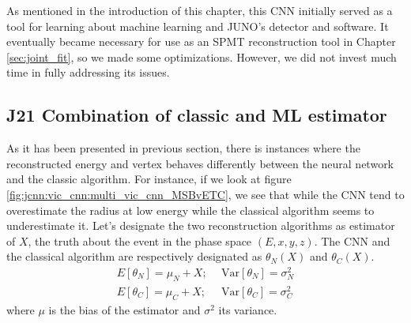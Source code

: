 \documentclass[../main.tex]{subfiles}
\begin{document}
As mentioned in the introduction of this chapter, this CNN initially served as a tool for learning about machine learning and JUNO's detector and software. It eventually became necessary for use as an SPMT reconstruction tool in Chapter \ref{sec:joint_fit}, so we made some optimizations. However, we did not invest much time in fully addressing its issues.

\subsection{J21 Combination of classic and ML estimator}
\label{sec:jcnn:combination}


As it has been presented in previous section, there is instances where the reconstructed energy and vertex behaves differently between the neural network and  the classic algorithm. For instance, if we look at figure \ref{fig:jcnn:vic_cnn:multi_vic_cnn_MSBvETC}, we see that while the CNN tend to overestimate the radius at low energy while the classical algorithm seems to underestimate it. Let's designate the two reconstruction algorithms as estimator of $X$, the truth about the event in the phase space $(E, x, y, z)$. The CNN and the classical algorithm are respectively designated as $\theta_{N}(X)$ and $\theta_{C}(X)$.
\begin{align}
  E[\theta_{N}] = \mu_N + X; ~&~ \mathrm{Var}[\theta_{N}] = \sigma^2_{N} \\
  E[\theta_{C}] = \mu_C + X; ~&~ \mathrm{Var}[\theta_{C}] = \sigma^2_{C}
\end{align}
where $\mu$ is the bias of the estimator and $\sigma^2$ its variance.
\end{document}
